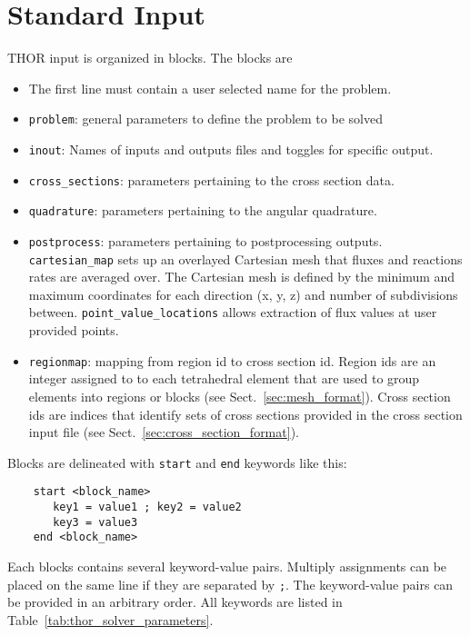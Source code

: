 \section{Standard Input}\label{ch:inp:sec:stdinput}
THOR input is organized in blocks. The blocks are
\begin{itemize}
    \item The first line must contain a user selected name for the problem.
    \item \verb"problem": general parameters to define the problem to be solved
    \item \verb"inout": Names of inputs and outputs files and toggles for specific output.
    \item \verb"cross_sections": parameters pertaining to the cross section data.
    \item \verb"quadrature": parameters pertaining to the angular quadrature.
    \item \verb"postprocess": parameters pertaining to postprocessing outputs. \verb"cartesian_map" sets up an overlayed Cartesian mesh that fluxes and reactions rates are averaged over. The Cartesian mesh is defined by the minimum and maximum coordinates for each direction (x, y, z) and number of subdivisions between. \verb"point_value_locations" allows extraction of flux values at user provided points.
    \item \verb"regionmap": mapping from region id to cross section id. Region ids are an integer assigned to to each tetrahedral element that are used to group elements into regions or blocks (see Sect.~\ref{sec:mesh_format}). Cross section ids are indices that identify sets of cross sections provided in the cross section input file (see Sect.~\ref{sec:cross_section_format}).
\end{itemize}

Blocks are delineated with \verb"start" and \verb"end" keywords like this:
\begin{verbatim}
    start <block_name>
       key1 = value1 ; key2 = value2
       key3 = value3
    end <block_name>
\end{verbatim}
Each blocks contains several keyword-value pairs. Multiply assignments can be placed on the same
line if they are separated by \verb";".
The keyword-value pairs can be provided in an arbitrary order.
All keywords are listed in Table~\ref{tab:thor_solver_parameters}.

